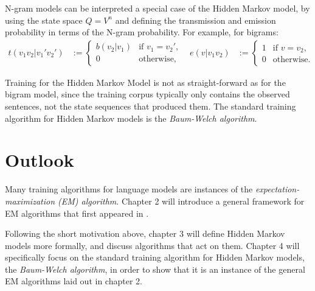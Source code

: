 N-gram models can be interpreted a special case of the Hidden Markov model, by
using the state space $Q = V^n$ and defining the transmission and emission
probability in terms of the N-gram probability. For example, for bigrams:
\begin{align*}
 t(v_1v_2|v_1'v_2') &:= \begin{cases}
  b(v_2|v_1) & \text{if } v_1 = v_2', \\
  0 &\text{otherwise},
 \end{cases} &
 e(v|v_1v_2) &:= \begin{cases}
  1 & \text{if } v = v_2, \\
  0 &\text{otherwise}.
 \end{cases}
\end{align*}

Training for the Hidden Markov Model is not as straight-forward as for the
bigram model, since the training corpus typically only contains the observed
sentences, not the state sequences that produced them. The standard training
algorithm for Hidden Markov models is the \emph{Baum-Welch algorithm}.
\cite{baupetsouwei70,baum1972}

\section{Outlook}

Many training algorithms for language models are instances of the
\emph{expectation-maximization (EM) algorithm}. \cite{demlairub77} Chapter 2
will introduce a general framework for EM algorithms that first appeared in
\cite{bucstuvog15}.

Following the short motivation above, chapter 3 will define Hidden Markov
models more formally, and discuss algorithms that act on them. Chapter 4 will
specifically focus on the standard training algorithm for Hidden Markov models,
the \emph{Baum-Welch algorithm}, in order to show that it is an instance of the
general EM algorithms laid out in chapter 2.
